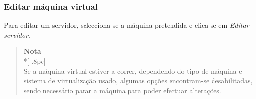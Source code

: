 \subsubsection{Editar máquina virtual}
\label{sec:edit_server}
Para editar um servidor, selecciona-se a máquina pretendida e clica-se em \emph{Editar servidor}.

    \begin{quote}
        {\large \bf Nota} \\*[-.8pc]
        \underline{\hspace{6in}} \\
        Se a máquina virtual estiver a correr, dependendo do tipo de máquina e sistema de virtualização usado, algumas opções encontram-se desabilitadas, sendo necessário parar a máquina para poder efectuar alterações.
    \end{quote}

